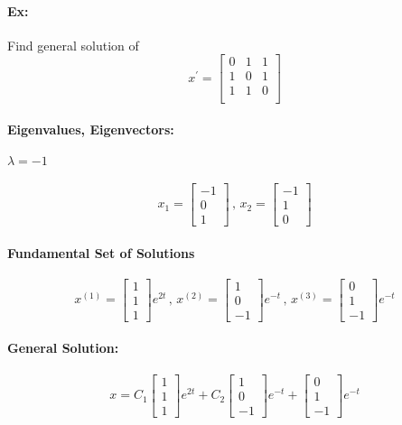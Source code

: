 \documentclass[letterpaper,12pt]{article}
\begin{document}
\paragraph{Ex:}Find general solution of 
\[
    x^{\prime} = \begin{bmatrix}
         0 & 1 & 1\\
        1 & 0 & 1\\
        1 & 1 & 0\\
    \end{bmatrix}
\]
\paragraph{Eigenvalues, Eigenvectors:}
\paragraph{$\lambda  = -1$}
\[
    x_1= \begin{bmatrix}
        -1\\0\\1
        \end{bmatrix}
    \,
    ,
    \,
    x_2 =
    \begin{bmatrix}
        -1\\1\\0
    \end{bmatrix}
\]
\paragraph{Fundamental Set of Solutions}
\[
    x^{(1)} = \begin{bmatrix}
        1\\1\\1
    \end{bmatrix}e^{2t}
    \,
    ,
    \,
    x^{(2)}= \begin{bmatrix}
        1\\0\\-1
    \end{bmatrix}e^{-t}
    \,
    ,
    \,
    x^{(3)}= \begin{bmatrix}
        0\\1\\-1
    \end{bmatrix}e^{-t}
\]
\paragraph{General Solution:}
\[
    x = C_1 
    \begin{bmatrix}
        1\\1\\1
    \end{bmatrix}e^{2t} + 
    C_2
    \begin{bmatrix}
        1\\0\\-1
    \end{bmatrix}e^{-t}
    +
    \begin{bmatrix}
        0\\1\\-1
    \end{bmatrix}e^{-t}
\]
\end{document}
